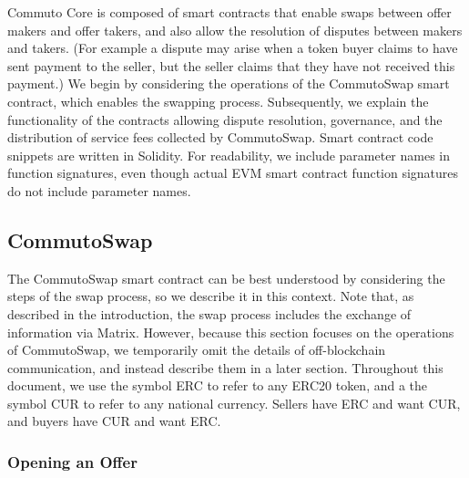 \documentclass[11pt]{article}
\begin{document}
    Commuto Core is composed of smart contracts that enable swaps between offer makers and offer
    takers, and also allow the resolution of disputes between makers and takers.
    (For example a dispute may arise when a token buyer claims to have sent payment to the seller,
    but the seller claims that they have not received this payment.)
    We begin by considering the operations of the CommutoSwap smart contract, which enables the
    swapping process.
    Subsequently, we explain the functionality of the contracts allowing dispute resolution,
    governance, and the distribution of service fees collected by CommutoSwap.
    Smart contract code snippets are written in Solidity\cite{Solidity}.
    For readability, we include parameter names in function signatures, even though actual EVM smart
    contract function signatures do not include parameter names.

    \subsection*{CommutoSwap}

    The CommutoSwap smart contract can be best understood by considering the steps of the swap
    process, so we describe it in this context.
    Note that, as described in the introduction, the swap process includes the exchange of
    information via Matrix.
    However, because this section focuses on the operations of CommutoSwap, we temporarily omit the
    details of off-blockchain communication, and instead describe them in a later section.
    Throughout this document, we use the symbol ERC to refer to any ERC20 token, and a the symbol
    CUR to refer to any national currency.
    Sellers have ERC and want CUR, and buyers have CUR and want ERC.

    \subsubsection*{Opening an Offer}
\end{document}
